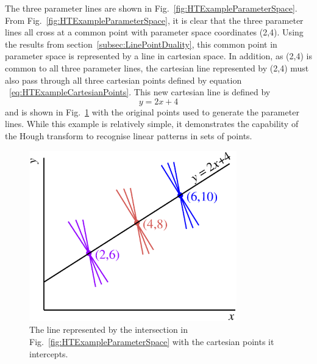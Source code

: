 The three parameter lines are shown in Fig.~\ref{fig:HTExampleParameterSpace}.  From Fig.~\ref{fig:HTExampleParameterSpace}, it is clear that the three parameter lines all cross at a common point with parameter space coordinates (2,4).  Using the results from section~\ref{subsec:LinePointDuality}, this common point in parameter space is represented by a line in cartesian space.  In addition, as (2,4) is common to all three parameter lines, the cartesian line represented by (2,4) must also pass through all three cartesian points defined by equation ~\ref{eq:HTExampleCartesianPoints}.  This new cartesian line is defined by
\begin{equation}
  y = 2x + 4
  \label{eq:HTExampleCartesianLine}
\end{equation}
and is shown in Fig.~\ref{fig:HTExampleCartesianSpaceWithLine} with the original points used to generate the parameter lines.  While this example is relatively simple, it demonstrates the capability of the Hough transform to recognise linear patterns in sets of points.

\begin{figure}
  \centering
  \includegraphics[width=9cm]{images/hough_transform/HT_example_cartesian_space_with_line}
  \caption{The line represented by the intersection in Fig.~\ref{fig:HTExampleParameterSpace} with the cartesian points it intercepts.}
  \label{fig:HTExampleCartesianSpaceWithLine}
\end{figure}

